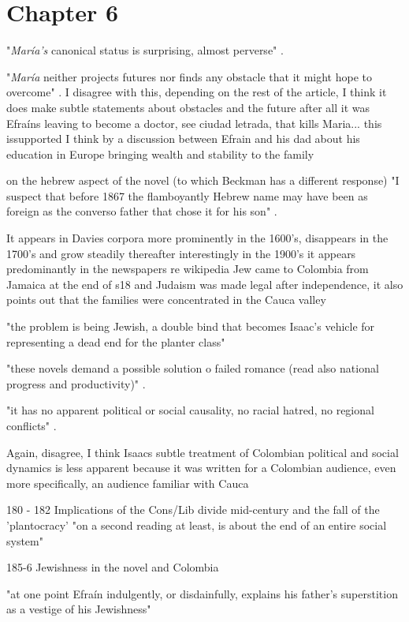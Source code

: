 \section{Chapter 6}
"\textit{María's} canonical status is surprising, almost perverse" \cite[172]{Sommer1991}.

"\textit{María} neither projects futures nor finds any obstacle that it might hope to overcome" \cite[172]{Sommer1991}.
I disagree with this, depending on the rest of the article, I think it does make subtle statements about obstacles and the future
after all it was Efraíns leaving to become a doctor, see ciudad letrada, that kills Maria... this issupported I think by a discussion between Efrain and his dad about his education in Europe bringing wealth and stability to the family 

on the hebrew aspect of the novel (to which Beckman has a different response)
"I suspect that before 1867 the flamboyantly Hebrew name may have been as foreign as the converso father that chose it for his son" \cite[173]{Sommer1991}.


It appears in Davies corpora more prominently in the 1600's, disappears in the 1700's and grow steadily thereafter 
interestingly in the 1900's it appears predominantly in the newspapers
re wikipedia Jew came to Colombia from Jamaica at the end of s18 and Judaism was made legal after independence, it also points out that the families were concentrated in the Cauca valley 

"the problem is being Jewish, a double bind that becomes Isaac's vehicle for representing a dead end for the planter class" \cite[173]{Sommer1991}

"these novels demand a possible solution o failed romance (read also national progress and productivity)" \cite[174]{Sommer1991}.

"it has no apparent political or social causality, no racial hatred, no regional conflicts" \cite[174]{Sommer1991}.


Again, disagree, I think Isaacs subtle treatment of Colombian political and social dynamics is less apparent because it was written for a Colombian audience, even more specifically, an audience familiar with Cauca

180 - 182 Implications of the Cons/Lib divide mid-century and the fall of the 'plantocracy'
"on a second reading at least, is about the end of an entire social system"

185-6 Jewishness in the novel and Colombia

"at one point Efraín indulgently, or disdainfully, explains his father's superstition as a vestige of his Jewishness"

